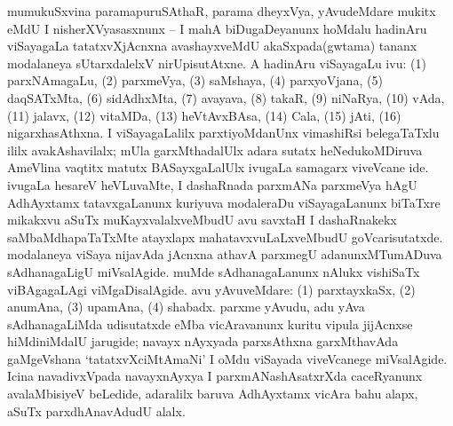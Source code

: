 mumukuSxvina paramapuruSAthaR, parama dheyxVya, yAvudeMdare mukitx eMdU I nisherXVyasasxnunx -- I mahA biDugaDeyanunx hoMdalu hadinAru viSayagaLa tatatxvXjAcnxna avashayxveMdU akaSxpada(gwtama) tananx modalaneya sUtarxdalelxV nirUpisutAtxne. A hadinAru viSayagaLu ivu: (1) parxNAmagaLu, (2) parxmeVya, (3) saMshaya, (4) parxyoVjana, (5) daqSATxMta, (6) sidAdhxMta, (7) avayava, (8) takaR, (9) niNaRya, (10) vAda, (11) jalavx, (12) vitaMDa, (13) heVtAvxBAsa, (14) Cala, (15) jAti, (16) nigarxhasAthxna. I viSayagaLalilx parxtiyoMdanUnx vimashiRsi belegaTaTxlu ililx avakAshavilalx; mUla garxMthadalUlx adara sutatx heNedukoMDiruva AmeVlina vaqtitx matutx BASayxgaLalUlx ivugaLa samagarx viveVcane ide. ivugaLa hesareV heVLuvaMte, I dashaRnada parxmANa parxmeVya hAgU AdhAyxtamx tatavxgaLanunx kuriyuva modaleraDu viSayagaLanunx biTaTxre mikakxvu aSuTx muKayxvalalxveMbudU avu savxtaH I dashaRnakekx saMbaMdhapaTaTxMte atayxlapx mahatavxvuLaLxveMbudU goVcarisutatxde. modalaneya viSaya nijavAda jAcnxna athavA parxmegU adanunxMTumADuva sAdhanagaLigU miVsalAgide. muMde sAdhanagaLanunx nAlukx vishiSaTx viBAgagaLAgi viMgaDisalAgide. avu yAvuveMdare: (1) parxtayxkaSx, (2) anumAna, (3) upamAna, (4) shabadx. parxme yAvudu, adu yAva sAdhanagaLiMda udisutatxde eMba vicAravanunx kuritu vipula jijAcnxse hiMdiniMdalU jarugide; navayx nAyxyada parxsAthxna garxMthavAda gaMgeVshana `tatatxvXciMtAmaNi' I oMdu viSayada viveVcanege miVsalAgide. Icina navadivxVpada navayxnAyxya I parxmANashAsatxrXda caceRyanunx avalaMbisiyeV beLedide, adaralilx baruva AdhAyxtamx vicAra bahu alapx, aSuTx parxdhAnavAdudU alalx.


